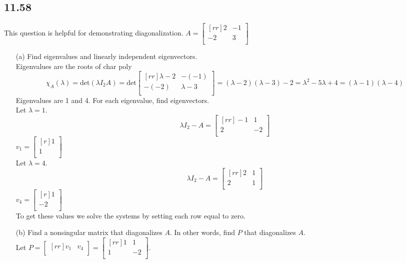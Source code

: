 \documentclass{report}
\begin{document}
\subsection{11.58}
This question is helpful for demonstrating diagonalization.
$A=\begin{bmatrix}[rr]2&-1\\-2&3\\\end{bmatrix}$\\
\begin{enumerate}
\item[(a)]Find eigenvalues and linearly independent eigenvectors.\\
Eigenvalues are the roots of char poly
\[ \chi_A(\lambda)=\mathrm{det}(\lambda I_2A) = \mathrm{det}\begin{bmatrix}[rr]\lambda -2 & -(-1)\\-(-2)&\lambda - 3\\\end{bmatrix} = (\lambda - 2)(\lambda - 3)-2 = \lambda^2-5\lambda + 4=(\lambda - 1)(\lambda - 4) \]
Eigenvalues are 1 and 4. For each eigenvalue, find eigenvectors.\\
Let $\lambda=1$. 
\[ \lambda I_2-A=\begin{bmatrix}[rr]-1&1\\2&-2\\\end{bmatrix} \]
$v_1 = \begin{bmatrix}[r]1\\1\\\end{bmatrix}$\\
Let $\lambda = 4$.
\[ \lambda I_2-A=\begin{bmatrix}[rr]2&1\\2&1\\\end{bmatrix} \]
$v_4 = \begin{bmatrix}[r]1\\-2\\\end{bmatrix}$\\
To get these values we solve the systems by setting each row equal to zero.
\item[(b)]Find a nonsingular matrix that diagonalizes $A$. In other words, find $P$ that diagonalizes $A$.\\
Let $P=\begin{bmatrix}[rr]v_1&v_4\\\end{bmatrix} = \begin{bmatrix}[rr]1&1\\1&-2\\\end{bmatrix}$.\\

\end{enumerate}
\end{document}
